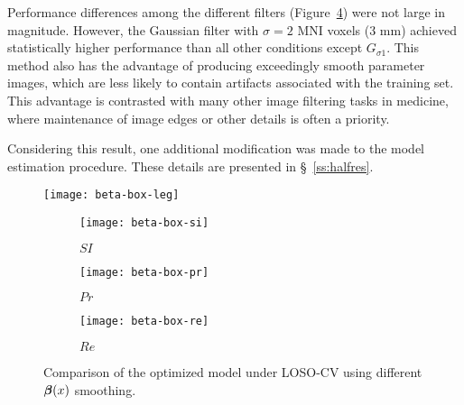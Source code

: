 Performance differences among the different filters
(Figure~\ref{fig:seg-box-beta}) were not large in magnitude.
However, the Gaussian filter with $\sigma = 2$ MNI voxels (3 mm)
achieved statistically higher performance than all other conditions except $G_{\sigma1}$.
This method also has the advantage of producing exceedingly smooth parameter images,
which are less likely to contain artifacts associated with the training set.
This advantage is contrasted with many other image filtering tasks in medicine,
where maintenance of image edges or other details is often a priority.
\par
Considering this result, one additional modification was made
to the model estimation procedure.
These details are presented in \S~\ref{ss:halfres}.
\begin{figure}
  \centering
  \texttt{[image: beta-box-leg]}\\[0.5em]
  \begin{subfigure}{0.32\textwidth}
    \centering\texttt{[image: beta-box-si]}
    \caption{$SI$}%
    \label{fig:seg-box-beta-si}
  \end{subfigure}
  \begin{subfigure}{0.32\textwidth}
    \centering\texttt{[image: beta-box-pr]}
    \caption{$Pr$}%
    \label{fig:seg-box-beta-pr}
  \end{subfigure}
  \begin{subfigure}{0.32\textwidth}
    \centering\texttt{[image: beta-box-re]}
    \caption{$Re$}%
    \label{fig:seg-box-beta-re}
  \end{subfigure}
  \caption{Comparison of the optimized model under LOSO-CV
    using different $\bm{\beta}(x)$ smoothing.}%
  \label{fig:seg-box-beta}
\end{figure}
